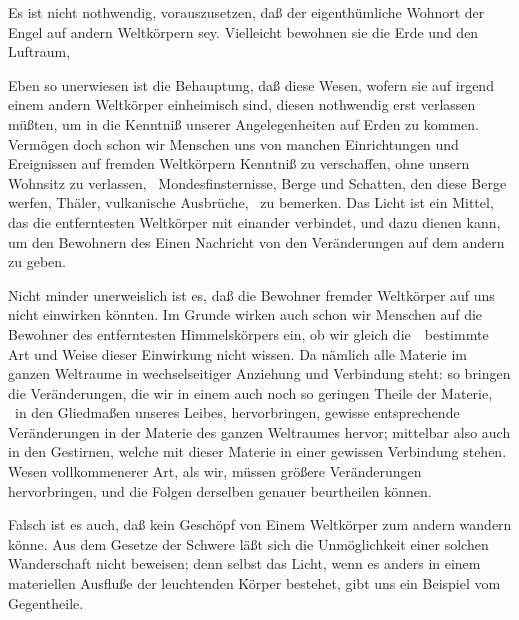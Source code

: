 \begin{aufza}
\begin{aufzb}
\begin{aufzc}
\item Es ist nicht nothwendig, vorauszusetzen, daß der eigenthümliche Wohnort der Engel auf andern Weltkörpern sey. Vielleicht bewohnen sie die Erde und den Luftraum, \udgl\ 
\item Eben so unerwiesen ist die Behauptung, daß diese Wesen, wofern sie auf irgend einem andern Weltkörper einheimisch sind, diesen nothwendig erst verlassen müßten, um in die Kenntniß unserer Angelegenheiten auf Erden zu kommen. Vermögen doch schon wir Menschen uns von manchen Einrichtungen und Ereignissen auf fremden Weltkörpern Kenntniß zu verschaffen, ohne unsern Wohnsitz zu verlassen, \zB\ Mondesfinsternisse, Berge und Schatten, den diese Berge werfen, Thäler, vulkanische Ausbrüche, \usw\ zu bemerken. Das Licht ist ein Mittel, das die entferntesten Weltkörper mit einander verbindet, und dazu dienen kann, um den Bewohnern des Einen Nachricht von den Veränderungen auf dem andern zu geben.
\item Nicht minder unerweislich ist es, daß die Bewohner fremder Weltkörper auf uns nicht einwirken könnten. Im Grunde wirken auch schon wir Menschen auf die Bewohner des entferntesten Himmelskörpers ein, ob wir gleich die~\RWSeitenw{305}\ bestimmte Art und Weise dieser Einwirkung nicht wissen. Da nämlich alle Materie im ganzen Weltraume in wechselseitiger Anziehung und Verbindung steht: so bringen die Veränderungen, die wir in einem auch noch so geringen Theile der Materie, \zB\ in den Gliedmaßen unseres Leibes, hervorbringen, gewisse entsprechende Veränderungen in der Materie des ganzen Weltraumes hervor; mittelbar also auch in den Gestirnen, welche mit dieser Materie in einer gewissen Verbindung stehen. Wesen vollkommenerer Art, als wir, müssen größere Veränderungen hervorbringen, und die Folgen derselben genauer beurtheilen können.
\item Falsch ist es auch, daß kein Geschöpf von Einem Weltkörper zum andern wandern könne. Aus dem Gesetze der Schwere läßt sich die Unmöglichkeit einer solchen Wanderschaft nicht beweisen; denn selbst das Licht, wenn es anders in einem materiellen Ausfluße der leuchtenden Körper bestehet, gibt uns ein Beispiel vom Gegentheile.

\end{aufzc}
\end{aufzb}
\end{aufza}
